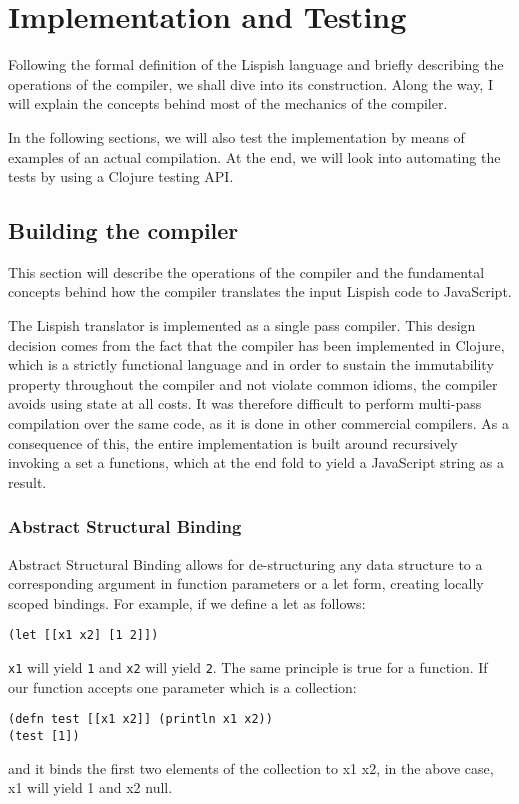 \chapter{Implementation and Testing}
Following the formal definition of the Lispish language and briefly describing the operations of the compiler, we shall dive into its construction. Along the way, I will explain the concepts behind most of the mechanics of the compiler. 

In the following sections, we will also test the implementation by means of examples of an actual compilation. 
At the end, we will look into automating the tests by using a Clojure testing API.  

\section{Building the compiler}
This section will describe the operations of the compiler and the fundamental concepts behind how the compiler translates the input Lispish code to JavaScript. 

The Lispish translator is implemented as a single pass compiler.
This design decision comes from the fact that the compiler has been implemented in Clojure, which is a strictly functional language and in order to sustain the immutability property throughout the compiler and not violate common idioms, the compiler avoids using state at all costs. It was therefore difficult to perform multi-pass compilation over the same code, as it is done in other commercial compilers. 
As a consequence of this, the entire implementation is built around recursively invoking a set a functions, which at the end fold to yield a JavaScript string as a result. 

\subsection{Abstract Structural Binding}
Abstract Structural Binding allows for de-structuring any data structure to a corresponding argument in function parameters or a let form, creating locally scoped bindings.
For example, if we define a let as follows:
\begin{verbatim}
(let [[x1 x2] [1 2]])
\end{verbatim}
\texttt{x1} will yield \texttt{1} and \texttt{x2} will yield \texttt{2}.
The same principle is true for a function.
If our function accepts one parameter which is a collection:

\begin{verbatim}
(defn test [[x1 x2]] (println x1 x2))
(test [1])
\end{verbatim}
and it binds the first two elements of the collection to x1 x2, in the above case, x1 will yield 1 and x2 null.

